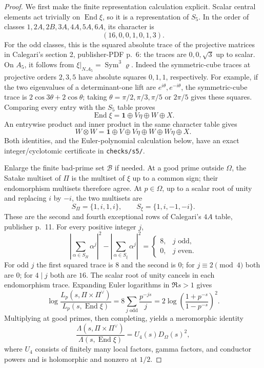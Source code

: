 \begin{proof}
We first make the finite representation calculation explicit.
Scalar central elements act trivially on $\operatorname{End}\xi$,
so it is a representation of $S_5$. In the order of classes
$1,2A,2B,3A,4A,5A,6A$, its character is
\[
                    (16,0,0,1,0,1,3).
\]
For the odd classes, this is the squared absolute trace of the
projective matrices in Calegari's section 2, publisher-PDF p.~6:
the traces are $0,0,\sqrt3$ up to scalar. On $A_5$, it follows
from $\xi|_{N.A_5}=\operatorname{Sym}^3\varrho$. Indeed the
symmetric-cube traces at projective orders $2,3,5$ have absolute
squares $0,1,1$, respectively. For example, if the two eigenvalues
of a determinant-one lift are $e^{i\theta},e^{-i\theta}$, the
symmetric-cube trace is
$2\cos3\theta+2\cos\theta$; taking $\theta=\pi/2,\pi/3,\pi/5$
or $2\pi/5$ gives these squares. Comparing every entry with
the $S_5$ table proves
\[
          \operatorname{End}\xi=\mathbf1\oplus V\eta\oplus W\oplus X.
 \tag{MA-S5.8}
\]
An entrywise product and inner product in the same character table
gives
\[
 W\otimes W=\mathbf1\oplus V\oplus V\eta\oplus W\oplus W\eta\oplus X.
 \tag{MA-S5.9}
\]
Both identities, and the Euler-polynomial calculation below, have
an exact integer/cyclotomic certificate in \texttt{checks/s5/}.

Enlarge the finite bad-prime set $\mathcal B$ if needed. At a good
prime outside $\Omega$, the Satake multiset of $\Pi$ is the
multiset of $\xi$ up to a common sign; their endomorphism
multisets therefore agree. At $p\in\Omega$, up to a scalar root
of unity and replacing $i$ by $-i$, the two multisets are
\[
          S_\Pi=\{1,i,1,i\},\qquad S_\xi=\{1,i,-1,-i\}.
\]
These are the second and fourth exceptional rows of Calegari's
$4A$ table, publisher p.~11. For every positive integer $j$,
\[
 \left|\sum_{\alpha\in S_\Pi}\alpha^j\right|^2
 -\left|\sum_{\alpha\in S_\xi}\alpha^j\right|^2
 =\begin{cases}8,&j\text{ odd},\\0,&j\text{ even}.\end{cases}
 \tag{MA-S5.10}
\]
For odd $j$ the first squared trace is $8$ and the second is
$0$; for $j\equiv2\pmod4$ both are $0$; for $4\mid j$ both
are $16$. The scalar root of unity cancels in each endomorphism
trace. Expanding Euler logarithms in $\Re s>1$ gives
\[
 \log\frac{L_p(s,\Pi\times\Pi^\vee)}{L_p(s,\operatorname{End}\xi)}
 =8\sum_{j\text{ odd}}\frac{p^{-js}}j
 =2\log\left(\frac{1+p^{-s}}{1-p^{-s}}\right)^2.
\]
Multiplying at good primes, then completing, yields a meromorphic
identity
\[
 \frac{\Lambda(s,\Pi\times\Pi^\vee)}
      {\Lambda(s,\operatorname{End}\xi)}
          =U_4(s)D_\Omega(s)^2,
 \tag{MA-S5.11}
\]
where $U_4$ consists of finitely many local factors, gamma factors,
and conductor powers and is holomorphic and nonzero at $1/2$.


\end{proof}
